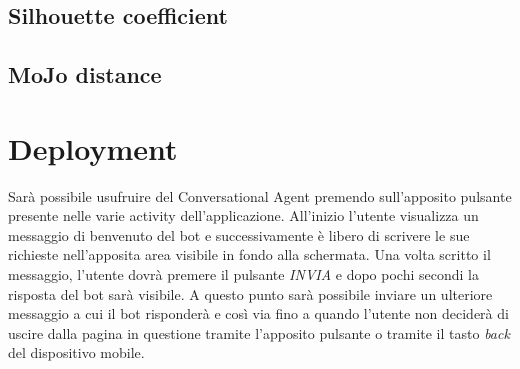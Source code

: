 \documentclass[a4paper, 10pt]{report}
\begin{document}
    \section{Silhouette coefficient}\label{sec:silhouette-coefficient}


    \section{MoJo distance}\label{sec:mojo-distance}


    \chapter{Deployment}\label{ch:deployment}

    Sarà possibile usufruire del Conversational Agent premendo sull'apposito pulsante presente nelle varie activity dell'applicazione.
    All'inizio l'utente visualizza un messaggio di benvenuto del bot e successivamente è libero di scrivere le sue
    richieste nell'apposita area visibile in fondo alla schermata. Una volta scritto il messaggio, l'utente dovrà premere il pulsante
    \textit{INVIA} e dopo pochi secondi la risposta del bot sarà visibile. A questo punto sarà possibile inviare un ulteriore messaggio a cui
    il bot risponderà e così via fino a quando l'utente non deciderà di uscire dalla pagina in questione tramite l'apposito pulsante
    o tramite il tasto \textit{back} del dispositivo mobile.
\end{document}
